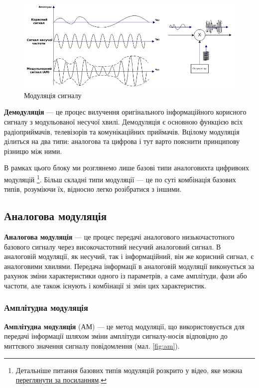 \documentclass{article}
\begin{document}
\begin{figure}[h!]
	\centering
	\includegraphics[width=0.9\linewidth]{images/modulation_signal.png}
	\caption{\label{fig:modulation_signal} Модуляція сигналу}
\end{figure}

\textbf{Демодуляція} --- це процес вилучення оригінального інформаційного корисного сигналу з модульованої несучої хвилі. Демодуляція є основною функцією всіх радіоприймачів, телевізорів та комунікаційних приймачів. 
Вцілому модуляція ділиться на два типи: аналогова та цифрова і тут варто пояснити принципову різницю між ними.

В рамках цього блоку ми розглянемо лише базові типи аналоговихта цифривоих модуляцій \footnote{Детальніше питання базових типів модуляцій розкрито у відео, яке можна \href{https://www.youtube.com/watch?v=gfz1FbIOMbs}{переглянути за посиланням}.}. Більш складні типи модуляції --- це по суті комбінація базових типів, розуміючи їх, відносно легко розібратися з іншими.


\subsection{Аналогова модуляція}
\textbf{Аналогова модуляція} --- це процес передачі аналогового низькочастотного базового сигналу через високочастотний несучий аналоговий сигнал. В аналоговій модуляції, як несучий, так і інформаційний, він же корисний сигнал, є аналоговими хвилями. Передача інформації в аналоговій модуляції виконується за рахунок зміни характеристики одного із параметрів, а саме амплітуди, фази або частоти, але також існують і комбінації зі змін цих характеристик.

\subsubsection{Амплітудна модуляція}
\textbf{Амплітудна модуляція} (АМ) --- це метод модуляції, що використовується для передачі інформації шляхом зміни амплітуди сигналу-носія відповідно до миттєвого значення сигналу повідомлення (мал. \ref{fig:am}).
\end{document}
